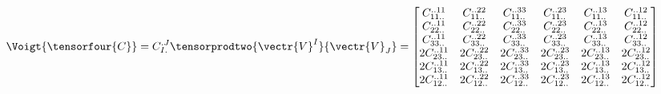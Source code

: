 \begin{equation}
  \Voigt{\tensorfour{C}}=C^{.J}_{I.}\tensorprodtwo{\vectr{V}^{I}}{\vectr{V}_{J}}=\begin{bmatrix}
    C^{..11}_{11..} & C^{..22}_{11..} & C^{..33}_{11..} & C^{..23}_{11..} & C^{..13}_{11..} & C^{..12}_{11..} \\
    C^{..11}_{22..} & C^{..22}_{22..} & C^{..33}_{22..} & C^{..23}_{22..} & C^{..13}_{22..} & C^{..12}_{22..} \\
    C^{..11}_{33..} & C^{..22}_{33..} & C^{..33}_{33..} & C^{..23}_{33..} & C^{..13}_{33..} & C^{..12}_{33..} \\
    2C^{..11}_{23..} & 2C^{..22}_{23..} & 2C^{..33}_{23..} & 2C^{..23}_{23..} & 2C^{..13}_{23..} & 2C^{..12}_{23..} \\
    2C^{..11}_{13..} & 2C^{..22}_{13..} & 2C^{..33}_{13..} & 2C^{..23}_{13..} & 2C^{..13}_{13..} & 2C^{..12}_{13..} \\
    2C^{..11}_{12..} & 2C^{..22}_{12..} & 2C^{..33}_{12..} & 2C^{..23}_{12..} & 2C^{..13}_{12..} & 2C^{..12}_{12..}     
  \end{bmatrix}
\end{equation}

